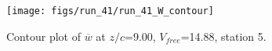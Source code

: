 \begin{figure}[H]
\centering
\texttt{[image: figs/run\_41/run\_41\_W\_contour]}
\caption{Contour plot of $\overline{w}$ at $z/c$=9.00, $V_{free}$=14.88, station 5.}
\label{fig:run_41_W_contour}
\end{figure}


